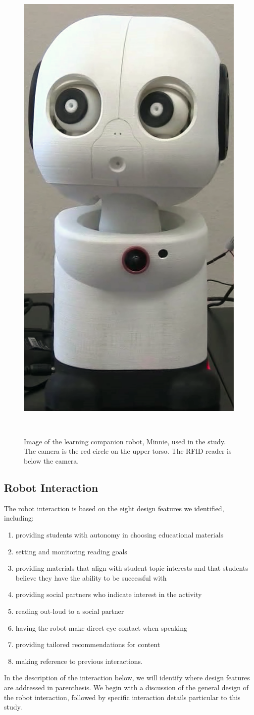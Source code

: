 \documentclass{sigchi}
\begin{document}
\begin{figure}
	\centering
	\includegraphics[width=0.6\columnwidth]{figures/minnie}
	\caption{Image of the learning companion robot, Minnie, used in the study. The camera is the red circle on the upper torso. The RFID reader is below the camera. }~\label{fig:figure2}
\end{figure}

\subsection{Robot Interaction}

The robot interaction is based on the eight design features we identified, including: 
\begin{enumerate}
\item providing students with autonomy in choosing educational materials
\item setting and monitoring reading goals
\item providing materials that align with student topic interests and that students believe they have the ability to be successful with
\item providing social partners who indicate interest in the activity
\item reading out-loud to a social partner
\item having the robot make direct eye contact when speaking
\item providing tailored recommendations for content
\item making reference to previous interactions. 
\end{enumerate}
 In the description of the interaction below, we will identify where design features are addressed in parenthesis. We begin with a discussion of the general design of the robot interaction, followed by specific interaction details particular to this study.
\end{document}
